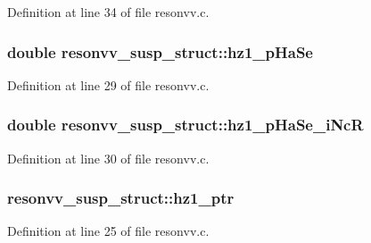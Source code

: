 Definition at line 34 of file resonvv.\+c.

\subsubsection[{\texorpdfstring{hz1\+\_\+p\+Ha\+Se}{hz1_pHaSe}}]{\setlength{\rightskip}{0pt plus 5cm}double resonvv\+\_\+susp\+\_\+struct\+::hz1\+\_\+p\+Ha\+Se}\hypertarget{structresonvv__susp__struct_a912b08d0288b3134418b8c5a6604e716}{}\label{structresonvv__susp__struct_a912b08d0288b3134418b8c5a6604e716}


Definition at line 29 of file resonvv.\+c.

\subsubsection[{\texorpdfstring{hz1\+\_\+p\+Ha\+Se\+\_\+i\+NcR}{hz1_pHaSe_iNcR}}]{\setlength{\rightskip}{0pt plus 5cm}double resonvv\+\_\+susp\+\_\+struct\+::hz1\+\_\+p\+Ha\+Se\+\_\+i\+NcR}\hypertarget{structresonvv__susp__struct_a45940de540e92a4b5af0cd1dd134387b}{}\label{structresonvv__susp__struct_a45940de540e92a4b5af0cd1dd134387b}


Definition at line 30 of file resonvv.\+c.

\subsubsection[{\texorpdfstring{hz1\+\_\+ptr}{hz1_ptr}}]{ resonvv\+\_\+susp\+\_\+struct\+::hz1\+\_\+ptr}\hypertarget{structresonvv__susp__struct_a77d30a5293a7d98f4bc0dea05f6f2d9f}{}\label{structresonvv__susp__struct_a77d30a5293a7d98f4bc0dea05f6f2d9f}


Definition at line 25 of file resonvv.\+c.

